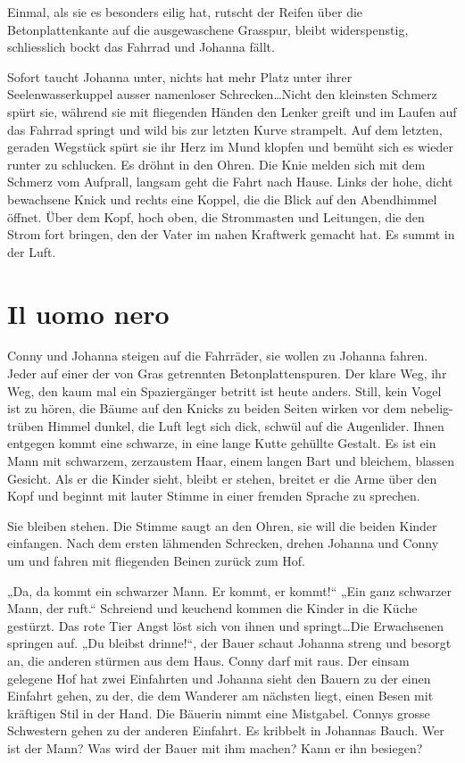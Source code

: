 \documentclass[10pt,titlepage,a5paper]{book}
\begin{document}
Einmal, als sie es besonders eilig hat, rutscht der Reifen über die Betonplattenkante auf die ausgewaschene Grasspur, bleibt widerspenstig, schliesslich bockt das Fahrrad und Johanna fällt.

Sofort taucht Johanna unter, nichts hat mehr Platz unter ihrer Seelenwasserkuppel ausser namenloser Schrecken\dots Nicht den kleinsten Schmerz spürt sie, während sie mit fliegenden Händen den Lenker greift und im Laufen auf das Fahrrad springt und wild bis zur letzten Kurve strampelt. Auf dem letzten, geraden Wegstück spürt sie ihr Herz im Mund klopfen und bemüht sich es wieder runter zu schlucken. Es dröhnt in den Ohren. Die Knie melden sich mit dem Schmerz vom Aufprall,  langsam geht die Fahrt nach Hause. Links der hohe, dicht bewachsene Knick und rechts eine Koppel, die die Blick auf den Abendhimmel öffnet. Über dem Kopf, hoch oben, die Strommasten und Leitungen, die den Strom fort bringen, den der Vater im nahen Kraftwerk gemacht hat. Es summt in der Luft.



\section*{Il uomo nero}



Conny und Johanna steigen auf die Fahrräder, sie wollen zu Johanna fahren. Jeder auf einer der von Gras getrennten Betonplattenspuren. Der klare Weg, ihr Weg, den kaum mal ein Spaziergänger betritt ist heute anders. Still, kein Vogel ist zu hören, die Bäume auf den Knicks zu beiden Seiten wirken vor dem nebelig-trüben Himmel dunkel, die Luft legt sich dick, schwül auf die Augenlider.
 Ihnen entgegen kommt eine schwarze, in eine lange Kutte gehüllte Gestalt. Es ist ein Mann mit schwarzem, zerzaustem  Haar, einem langen Bart und bleichem, blassen Gesicht. Als er die Kinder sieht, bleibt er stehen, breitet er die Arme über den Kopf und beginnt mit lauter Stimme in einer fremden Sprache zu sprechen.
 
Sie bleiben stehen. Die Stimme saugt an den Ohren, sie will die beiden Kinder einfangen. Nach dem ersten lähmenden Schrecken, drehen Johanna und Conny um und fahren mit fliegenden Beinen zurück zum Hof.

„Da, da kommt ein schwarzer Mann. Er kommt, er kommt!“ „Ein ganz schwarzer Mann, der ruft.“ Schreiend und keuchend kommen die Kinder in die Küche gestürzt. Das rote Tier Angst löst sich von ihnen und springt\dots Die Erwachsenen springen auf. „Du bleibst drinne!“, der Bauer schaut Johanna streng und besorgt an, die anderen stürmen aus dem Haus. Conny darf mit raus. Der einsam gelegene Hof hat zwei Einfahrten und Johanna sieht den Bauern zu der einen Einfahrt gehen, zu der, die dem Wanderer am nächsten liegt, einen Besen mit kräftigen Stil in der Hand. Die Bäuerin nimmt eine Mistgabel. Connys grosse Schwestern gehen zu der anderen Einfahrt. Es kribbelt in Johannas Bauch. Wer ist der Mann? Was wird der Bauer mit ihm machen? Kann er ihn besiegen?
\end{document}
